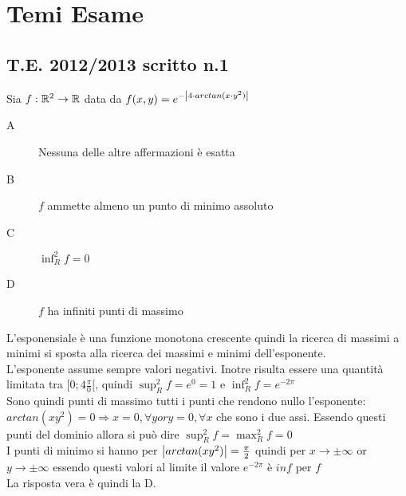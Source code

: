 \chapter{Temi Esame}
\section{T.E. 2012/2013 scritto n.1}
\begin{exercise}
	Sia $f: \mathbb{R}^2 \rightarrow \mathbb{R}$ data da $f(x, y)=e^{-\left|4\cdot arctan(x\cdot y^2)\right|}$
	\begin{description}
		\item[A] Nessuna delle altre affermazioni è esatta
		\item[B] $f$ ammette almeno un punto di minimo assoluto
		\item[C] $\inf_R^2f = 0$
		\item[D] $f$ ha infiniti punti di massimo
	\end{description}
	L'esponensiale è una funzione monotona crescente quindi la ricerca di massimi a minimi si sposta alla ricerca dei massimi e minimi dell'esponente.\\
	L'esponente assume sempre valori negativi. Inotre risulta essere una quantità limitata tra $[0;4\frac{\pi}{0}[$, quindi $\sup_R^2f=e^0=1$ e $\inf_R^2f=e^{-2\pi}$\\
	Sono quindi punti di massimo tutti i punti che rendono nullo l'esponente: $arctan(xy^2)=0\Rightarrow x=0,\forall y or y=0,\forall x$ che sono i due assi. Essendo questi punti del dominio allora si può dire $\sup_R^2f=\max_R^2f=0$\\
	I punti di minimo si hanno per $\left|arctan(xy^2)\right|=\frac{\pi}{2}$ quindi per $x\rightarrow \pm\infty$ or $y\rightarrow \pm\infty$ essendo questi valori al limite il valore $e^{-2\pi}$ è $inf$ per $f$\\
	La risposta vera è quindi la D.\\
\end{exercise}
